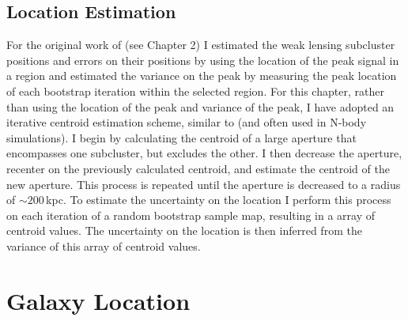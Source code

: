 \subsection{Location Estimation}\label{section:LocationEstimation}
For the original work of \citet{Dawson:2012dl} (see Chapter 2) I estimated the weak lensing subcluster positions and errors on their positions by using the location of the peak signal in a region and estimated the variance on the peak by measuring the peak location of each bootstrap iteration within the selected region.  
For this chapter, rather than using the location of the peak and variance of the peak, I have adopted an iterative centroid estimation scheme, similar to \citet{Randall:2008hs} (and often used in N-body simulations). 
I begin by calculating the centroid of a large aperture that encompasses one subcluster, but excludes the other.
I then decrease the aperture, recenter on the previously calculated centroid, and estimate the centroid of the new aperture.
This process is repeated until the aperture is decreased to a radius of $\sim200$\,kpc.
To estimate the uncertainty on the location I perform this process on each iteration of a random bootstrap sample map, resulting in a array of centroid values.
 The uncertainty on the location is then inferred from the variance of this array of centroid values.


\section{Galaxy Location}\label{section:GalaxyLocation}

